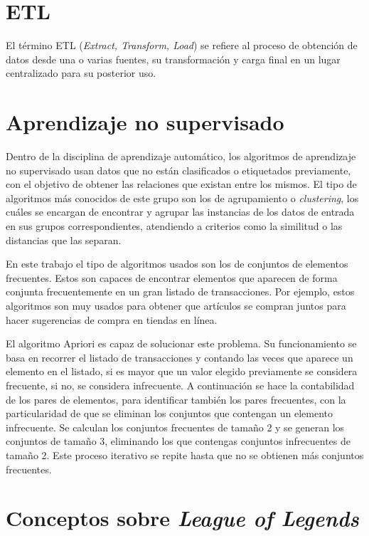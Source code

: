
\section{ETL}
El término ETL (\textit{Extract, Transform, Load}) se refiere al proceso de obtención de datos desde una o varias fuentes, su transformación y carga final en un lugar centralizado para su posterior uso.

\section{Aprendizaje no supervisado}
Dentro de la disciplina de aprendizaje automático, los algoritmos de aprendizaje no supervisado usan datos que no están clasificados o etiquetados previamente, con el objetivo de obtener las relaciones que existan entre los mismos. El tipo de algoritmos más conocidos de este grupo son los de agrupamiento o \textit{clustering}, los cuáles se encargan de encontrar y agrupar las instancias de los datos de entrada en sus grupos correspondientes, atendiendo a criterios como la similitud o las distancias que las separan.

En este trabajo el tipo de algoritmos usados son los de conjuntos de elementos frecuentes. Estos son capaces de encontrar elementos que aparecen de forma conjunta frecuentemente en un gran listado de transacciones. Por ejemplo, estos algoritmos son muy usados para obtener que artículos se compran juntos para hacer sugerencias de compra en tiendas en línea.

El algoritmo Apriori es capaz de solucionar este problema. Su funcionamiento se basa en recorrer el listado de transacciones y contando las veces que aparece un elemento en el listado, si es mayor que un valor elegido previamente se considera frecuente, si no, se considera infrecuente. A continuación se hace la contabilidad de los pares de elementos, para identificar también los pares frecuentes, con la particularidad de que se eliminan los conjuntos que contengan un elemento infrecuente. Se calculan los conjuntos frecuentes de tamaño 2 y se generan los conjuntos de tamaño 3, eliminando los que contengas conjuntos infrecuentes de tamaño 2. Este proceso iterativo se repite hasta que no se obtienen más conjuntos frecuentes.

\section{Conceptos sobre \textit{League of Legends}}
\label{sec:lol-conceptos}
